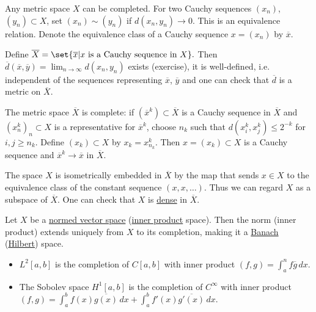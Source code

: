 \documentclass{article}
\begin{document}
\begin{remark}
    Any metric space $X$ can be completed.
    For two Cauchy sequences $(x_n)$, $(y_n) \subset X$, set $(x_n) \sim (y_n)$ if $d(x_n, y_n) \to 0$.
    This is an equivalence relation. Denote the equivalence class of a Cauchy sequence $x = (x_n)$ by $\overline{x}$.

    Define
    $\overline{X} = \set{\overline{x} | x \text{ is a Cauchy sequence in } X}.$
    Then $\overline{d}(\overline{x}, \overline{y}) = \lim_{n \to \infty} d(x_n,y_n)$ exists (exercise), it is well-defined, i.e. independent of the sequences representing $\overline{x}$, $\overline{y}$ and one can check that $\overline{d}$ is a metric on $\overline{X}$.

    The metric space $\overline{X}$ is complete: if $(\overline{x}^k) \subset \overline{X}$ is a Cauchy sequence in $\overline{X}$ and $(x^k_n)_n \subset X$ is a representative for $\overline{x}^k$, choose $n_k$ such that $d(x_i^k, x_j^k) \leq 2^{-k}$ for $i, j \geq n_k$.
    Define $(x_k) \subset X$ by $x_k = x_{n_k}^k$. Then $x = (x_k) \subset X$ is a Cauchy sequence and $\overline{x}^k \to \overline{x}$ in $\overline{X}$.

    The space $X$ is isometrically embedded in $\overline{X}$ by the map that sends $x \in X$ to the equivalence class of the constant sequence $(x, x, \dotsc)$.
    Thus we can regard $X$ as a subspace of $\overline{X}$.
    One can check that $X$ is \hyperlink{def:dense}{dense} in $\overline{X}$.
\end{remark}

\begin{ex}
    Let $X$ be a \hyperlink{def:nvs}{normed vector space} (\hyperlink{def:ip}{inner product} space).
    Then the norm (inner product) extends uniquely from $X$ to its completion, making it a \hyperlink{def:banach}{Banach} (\hyperlink{def:euclidean}{Hilbert}) space.
\end{ex}

\begin{eg}
    \leavevmode
    \begin{itemize}
        \item $L^2[a,b]$ is the completion of $C[a, b]$ with inner product $(f,g) = \int_a^n f \overline{g} \, dx$.
        \item The Sobolev space $H^1[a,b]$ is the completion of $C^\infty$ with inner product $(f, g) = \int_a^b f(x) \overline{g(x)} \, dx + \int_a^b f'(x) \overline{g'(x)} \, dx$.
    \end{itemize}
\end{eg}
\end{document}
